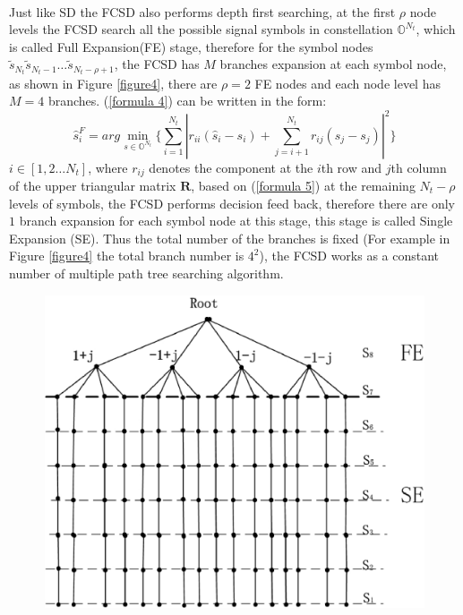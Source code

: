 \documentclass[12pt,a4paper,final]{article}
\begin{document}
\begin{spacing}{2.5}
\paragraph{}Just like SD the FCSD also performs depth first searching, at the first $\rho$ node levels the FCSD search all the possible signal symbols in constellation $\mathbb{O}^{N_{t}}$, which is called Full Expansion(FE) stage, therefore for the symbol nodes $\widetilde{s}_{N_{t}} \widetilde{s}_{N_{t}-1}\dots \widetilde{s}_{N_{t}-\rho+1}$, the FCSD has $M$ branches expansion at each symbol node,  as shown in Figure \ref{figure4}, there are $\rho=2$ FE nodes and each node level has $M=4$ branches. (\ref{formula 4}) can be written in the form: 
\begin{equation}
\hat{s}^{F}_{i}=arg\min_{s\in \mathbb{O}^{N_{t}}}\{\sum_{i=1}^{N_{t}}|r_{ii}(\hat{s}_{i}-s_{i})+\sum_{j=i+1}^{N_{t}}r_{ij}(\hat{s}_{j}-s_{j})|^{2}\}  \label{formula 5}
\end{equation} 
$i\in [1,2\dots N_{t}]$, where $r_{ij}$ denotes the component at the $i$th row and $j$th column of the upper triangular matrix $\mathbf{R}$,  based on (\ref{formula 5}) at the remaining $N_{t}-\rho$ levels of symbols, the FCSD performs decision feed back, therefore there are only $1$ branch expansion for each symbol node at this stage, this stage is called Single Expansion (SE). 
Thus the total number of the branches is fixed (For example in Figure \ref{figure4} the total branch number is $4^{2}$), the FCSD works as a constant number of multiple path tree searching algorithm.
\begin{figure}[htb]
\centering
\includegraphics[scale=0.8]{FCSD_tree_searching.eps}

\end{figure}
\end{spacing}
\end{document}
